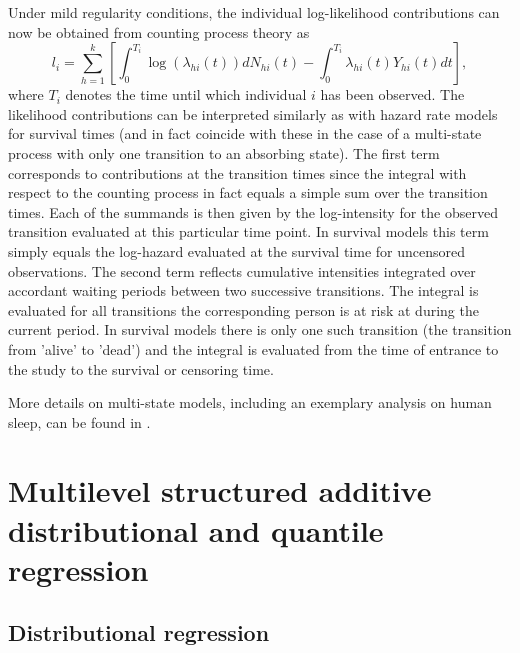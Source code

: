 \documentclass[11pt,a4paper,twoside]{bayesxarticle}
\begin{document}
Under mild regularity conditions, the individual log-likelihood
contributions can now be obtained from counting process theory as
\begin{equation}\label{loglike1}
 l_i = \sum_{h=1}^k\left[ \int_0^{T_i}\log(\lambda_{hi}(t))dN_{hi}(t) -
 \int_0^{T_i}\lambda_{hi}(t)Y_{hi}(t)dt\right],
\end{equation}
where $T_i$ denotes the time until which individual $i$ has been
observed. The likelihood contributions can be interpreted similarly
as with hazard rate models for survival times (and in fact coincide
with these in the case of a multi-state process with only one
transition to an absorbing state). The first term corresponds to
contributions at the transition times since the integral with
respect to the counting process in fact equals a simple sum over the
transition times. Each of the summands is then given by the
log-intensity for the observed transition evaluated at this
particular time point. In survival models this term simply equals
the log-hazard evaluated at the survival time for uncensored
observations. The second term reflects cumulative intensities
integrated over accordant waiting periods between two successive
transitions. The integral is evaluated for all transitions the
corresponding person is at risk at during the current period. In
survival models there is only one such transition (the transition
from 'alive' to 'dead') and the integral is evaluated from the time
of entrance to the study to the survival or censoring time.

More details on multi-state models, including an exemplary analysis on human sleep, can be found in .

\section{Multilevel structured additive distributional and quantile regression}\label{distreg_star}

\subsection{Distributional regression}
\end{document}
